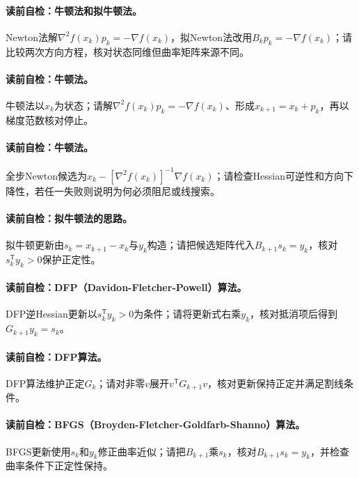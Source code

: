 \paragraph{读前自检：牛顿法和拟牛顿法。}Newton法解$\nabla^2f(x_k)p_k=-\nabla f(x_k)$，拟Newton法改用$B_kp_k=-\nabla f(x_k)$；请比较两次方向方程，核对状态同维但曲率矩阵来源不同。\par
\paragraph{读前自检：牛顿法。}牛顿法以$x_k$为状态；请解$\nabla^2f(x_k)p_k=-\nabla f(x_k)$、形成$x_{k+1}=x_k+p_k$，再以梯度范数核对停止。\par
\paragraph{读前自检：牛顿法。}全步Newton候选为$x_k-[\nabla^2f(x_k)]^{-1}\nabla f(x_k)$；请检查Hessian可逆性和方向下降性，若任一失败则说明为何必须阻尼或线搜索。\par
\paragraph{读前自检：拟牛顿法的思路。}拟牛顿更新由$s_k=x_{k+1}-x_k$与$y_k$构造；请把候选矩阵代入$B_{k+1}s_k=y_k$，核对$s_k^{\mathsf T}y_k>0$保护正定性。\par
\paragraph{读前自检：DFP（Davidon-Fletcher-Powell）算法。}DFP逆Hessian更新以$s_k^{\mathsf T}y_k>0$为条件；请将更新式右乘$y_k$，核对抵消项后得到$G_{k+1}y_k=s_k$。\par
\paragraph{读前自检：DFP算法。}DFP算法维护正定$G_k$；请对非零$v$展开$v^{\mathsf T}G_{k+1}v$，核对更新保持正定并满足割线条件。\par
\paragraph{读前自检：BFGS（Broyden-Fletcher-Goldfarb-Shanno）算法。}BFGS更新使用$s_k$和$y_k$修正曲率近似；请把$B_{k+1}$乘$s_k$，核对$B_{k+1}s_k=y_k$，并检查曲率条件下正定性保持。\par
